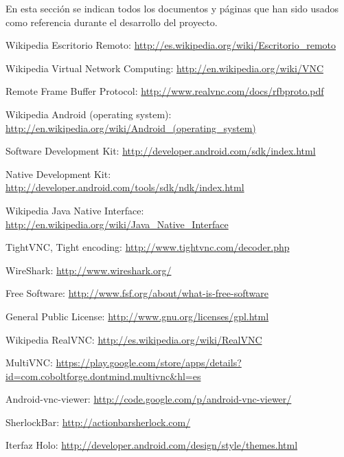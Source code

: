 En esta sección se indican todos los documentos y páginas que han sido usados como referencia durante el desarrollo del proyecto.

\begin{thebibliography}{11}

Wikipedia Escritorio Remoto: \url{http://es.wikipedia.org/wiki/Escritorio_remoto}

Wikipedia Virtual Network Computing: \url{http://en.wikipedia.org/wiki/VNC}

Remote Frame Buffer Protocol: \url{http://www.realvnc.com/docs/rfbproto.pdf}

Wikipedia Android (operating system): \url{http://en.wikipedia.org/wiki/Android_(operating_system)}

Software Development Kit:  \url{http://developer.android.com/sdk/index.html}

Native Development Kit: \url{http://developer.android.com/tools/sdk/ndk/index.html}

Wikipedia Java Native Interface: \url{http://en.wikipedia.org/wiki/Java_Native_Interface}

TightVNC, Tight encoding: \url{http://www.tightvnc.com/decoder.php}

WireShark: \url{http://www.wireshark.org/}

Free Software: \url{http://www.fsf.org/about/what-is-free-software}

General Public License: \url{http://www.gnu.org/licenses/gpl.html}

Wikipedia RealVNC: \url{http://es.wikipedia.org/wiki/RealVNC}

MultiVNC: \url{https://play.google.com/store/apps/details?id=com.coboltforge.dontmind.multivnc&hl=es}

Android-vnc-viewer: \url{http://code.google.com/p/android-vnc-viewer/}

SherlockBar: \url{http://actionbarsherlock.com/}

Iterfaz Holo: \url{http://developer.android.com/design/style/themes.html}

\end{thebibliography} 
